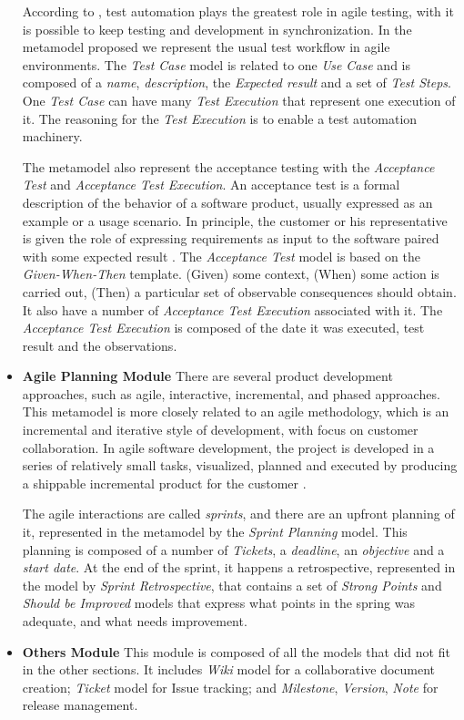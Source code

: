 \begin{itemize}
According to \cite{Shaye2008}, test automation plays the greatest role in agile testing, with it is possible to keep testing and development in synchronization.
In the metamodel proposed we represent the usual test workflow in agile environments. The \textit{Test Case} model is related to one \textit{Use Case} and is composed of a \textit{name}, \textit{description}, the \textit{Expected result} and a set of \textit{Test Steps}. One \textit{Test Case} can have many \textit{Test Execution} that represent one execution of it.  The reasoning for the \textit{Test Execution} is to enable a test automation machinery.

The metamodel also represent the acceptance testing with the \textit{Acceptance Test} and \textit{ Acceptance Test Execution}.  An acceptance test is a formal description of the behavior of a software product, usually expressed as an example or a usage scenario. In principle, the customer or his representative is given the role of expressing requirements as input to the software paired with some expected result \citep{Shaye2008}.  The \textit{Acceptance Test} model is based on the \textit{Given-When-Then} template. (Given) some context, (When) some action is carried out, (Then) a particular set of observable consequences should obtain. It also have a number of \textit{Acceptance Test Execution} associated with it. The \textit{Acceptance Test Execution} is composed of the date it was executed, test result and the observations.
\item  \textbf{ Agile Planning Module }
There are several product development approaches, such as agile, interactive, incremental, and phased approaches. This metamodel is more closely related to an agile methodology, which is an incremental and iterative style of development, with focus on customer collaboration. In agile software development, the project is developed in a series of relatively small tasks, visualized, planned and executed by producing a shippable incremental product for the customer \citep{Uikey2012}.

The agile interactions are called \textit{sprints}, and there are an upfront planning of it, represented in the metamodel by the \textit{Sprint Planning} model. This planning is composed of a number of \textit{Tickets}, a \textit{deadline}, an \textit{objective} and a \textit{start date}. At the end of the sprint, it happens a retrospective, represented in the model by \textit{Sprint Retrospective}, that contains a set of \textit{Strong Points} and \textit{Should be Improved} models that express what points in the spring was adequate, and what needs improvement. 
\item  \textbf{ Others Module }
This module is composed of all the models that did not fit in the other sections. It includes \textit{Wiki} model for a collaborative document creation; \textit{Ticket} model for Issue tracking; and \textit{Milestone}, \textit{Version}, \textit{Note} for release management.

\end{itemize}





